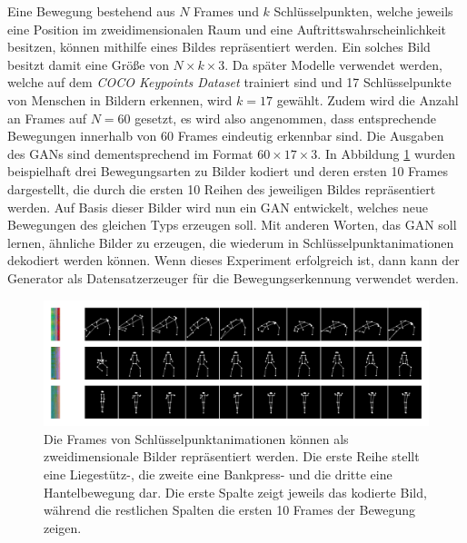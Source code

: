 Eine Bewegung bestehend aus $N$ Frames und $k$ Schlüsselpunkten, welche jeweils
eine Position im zweidimensionalen Raum und eine Auftrittswahrscheinlichkeit
besitzen, können mithilfe eines Bildes repräsentiert werden. Ein solches Bild
besitzt damit eine Größe von $N \times k \times 3$. Da später Modelle verwendet
werden, welche auf dem \textit{COCO Keypoints Dataset} \cite{lin2015microsoft}
trainiert sind und 17 Schlüsselpunkte von Menschen in Bildern erkennen, wird $k
= 17$ gewählt. Zudem wird die Anzahl an Frames auf $N = 60$ gesetzt, es wird
also angenommen, dass entsprechende Bewegungen innerhalb von 60 Frames eindeutig
erkennbar sind. Die Ausgaben des GANs sind dementsprechend im Format $60 \times
17 \times 3$. In Abbildung \ref{fig:motion-images} wurden beispielhaft drei
Bewegungsarten zu Bilder kodiert und deren ersten 10 Frames dargestellt, die
durch die ersten 10 Reihen des jeweiligen Bildes repräsentiert werden. Auf Basis
dieser Bilder wird nun ein GAN entwickelt, welches neue Bewegungen des gleichen
Typs erzeugen soll. Mit anderen Worten, das GAN soll lernen, ähnliche Bilder zu
erzeugen, die wiederum in Schlüsselpunktanimationen dekodiert werden können.
Wenn dieses Experiment erfolgreich ist, dann kann der Generator als
Datensatzerzeuger für die Bewegungserkennung verwendet werden.

\begin{figure}
    \includegraphics[width=\textwidth]{images/motion_image.png}
    \caption{Die Frames von Schlüsselpunktanimationen können als
    zweidimensionale Bilder repräsentiert werden. Die erste Reihe stellt eine
    Liegestütz-, die zweite eine Bankpress- und die dritte eine Hantelbewegung
    dar. Die erste Spalte zeigt jeweils das kodierte Bild, während die
    restlichen Spalten die ersten 10 Frames der Bewegung zeigen.}
    \label{fig:motion-images}
\end{figure}


